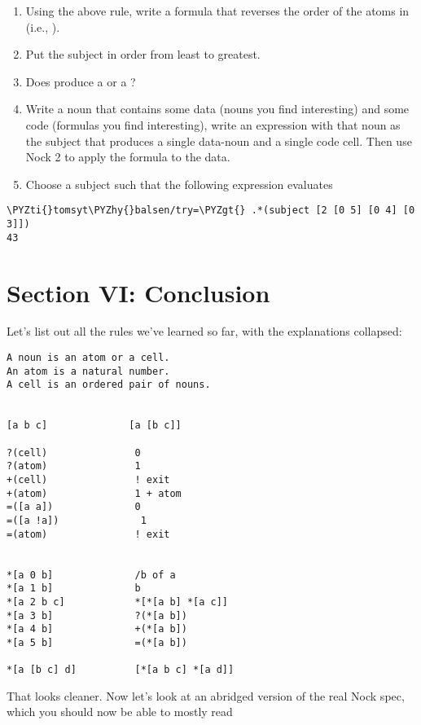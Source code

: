 \begin{enumerate}
\item Using the above rule, write a formula that reverses the order of the atoms in \kode{[42 46 [68 69] 55]} (i.e., \kode{[55 [68 69] 46 42]}).
\item Put the subject \kode{[4 3 7 2 5 1 6]} in order from least to greatest.
\item Does \kode{*[[42 42] 5 [0 1] [0 3]]} produce a  or a ?
\item Write a noun that contains some data (nouns you find interesting) and some code (formulas you find interesting), write an expression with that noun as the subject that produces a single data-noun and a single code cell. Then use Nock 2 to apply the formula to the data.
\item Choose a subject such that the following expression evaluates
\end{enumerate}

\begin{framed_shaded}
\begin{Verbatim}[fontsize=\relsize{-2.5},commandchars=\\\{\}]
\PYZti{}tomsyt\PYZhy{}balsen/try=\PYZgt{} .*(subject [2 [0 5] [0 4] [0 3]])
43
\end{Verbatim}
\end{framed_shaded}

\section{Section VI: Conclusion}

Let's list out all the rules we've learned so far, with the explanations collapsed:

\begin{framed_shaded}
\begin{Verbatim}[fontsize=\relsize{-2.5},commandchars=\\\{\}]
A noun is an atom or a cell.
An atom is a natural number.
A cell is an ordered pair of nouns.


[a b c]              [a [b c]]

?(cell)               0
?(atom)               1
+(cell)               ! exit
+(atom)               1 + atom
=([a a])              0
=([a !a])              1
=(atom)               ! exit


*[a 0 b]              /b of a
*[a 1 b]              b
*[a 2 b c]            *[*[a b] *[a c]]
*[a 3 b]              ?(*[a b])
*[a 4 b]              +(*[a b])
*[a 5 b]              =(*[a b])

*[a [b c] d]          [*[a b c] *[a d]]
\end{Verbatim}
\end{framed_shaded}
That looks cleaner. Now let's look at an abridged version of the real Nock spec, which you should now be able to mostly read


